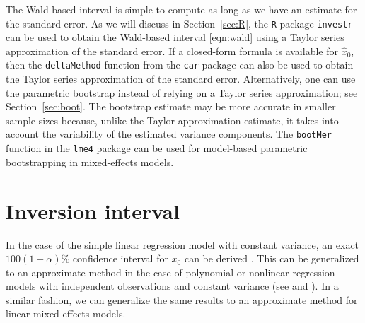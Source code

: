 \documentclass{article}\usepackage[]{graphicx}\usepackage[]{color}
\begin{document}
The Wald-based interval is simple to compute as long as we have an estimate for the standard error. As we will discuss in Section~\ref{sec:R}, the \texttt{R} package \texttt{investr} \citep{investr-package} can be used to obtain the Wald-based interval \eqref{eqn:wald} using a Taylor series approximation of the standard error. If a closed-form formula is available for $\widehat{x}_0$, then the \texttt{deltaMethod} function from the \texttt{car} package \citep{fox-car-2011} can also be used to obtain the Taylor series approximation of the standard error. Alternatively, one can use the parametric bootstrap instead of relying on a Taylor series approximation; see Section~\ref{sec:boot}. The bootstrap estimate may be more accurate in smaller sample sizes because, unlike the Taylor approximation estimate, it takes into account the variability of the estimated variance components. The \texttt{bootMer} function in the \texttt{lme4} package \citep{bates-lme4-2014} can be used for model-based parametric bootstrapping in mixed-effects models.



\section{Inversion interval}\label{sec:inversion}

In the case of the simple linear regression model with constant variance, an exact $100(1-\alpha)\%$ confidence interval for $x_0$ can be derived \citep{graybill-theory-1976}.  This can be generalized to an approximate method in the case of polynomial or nonlinear regression models with independent observations and constant variance (see \citet{seber-nonlinear-2003} and \citet{huet-statistical-2004}).  In a similar fashion, we can generalize the same results to an approximate method for linear mixed-effects models.  
\end{document}
